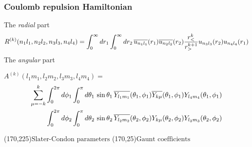 \begin{frame}[t]
  \frametitle{Coulomb repulsion Hamiltonian}
  \footnotesize
  The \emph{radial} part
  \[
  R^{(k)}(n_1l_1,n_2l_2,n_3l_3,n_4l_4) =
  \int_0^\infty dr_1 \int_0^\infty dr_2\, \overline{u_{n_1l_1}}(r_1) \overline{u_{n_2l_2}}(r_2)
  \frac{r_<^k}{r_>^{k+1}} u_{n_3l_3}(r_2) u_{n_4l_4}(r_1)
  \]
  The \emph{angular} part
  
  \vspace{1em}
  $A^{(k)}(l_1m_1,l_2m_2,l_3m_3,l_4m_4) =$
  \begin{align*}
  \sum_{\mu=-k}^k
  & \int_0^{2\pi}d\phi_1 \int_0^{\pi}d\theta_1\,\sin{\theta_1}\,
    \overline{Y_{l_1m_1}}(\theta_1,\phi_1) \overline{Y_{k\mu}}(\theta_1,\phi_1) Y_{l_4m_4}(\theta_1,\phi_1) \nonumber \\
  & \int_0^{2\pi}d\phi_2 \int_0^{\pi}d\theta_2\,\sin{\theta_2}\,
    \overline{Y_{l_2m_2}}(\theta_2,\phi_2) Y_{k\mu}(\theta_2,\phi_2) Y_{l_3m_3}(\theta_2,\phi_2)
  \end{align*} \pause
  
  \Put(170,225){\emph{$\boxed{\text{Slater-Condon parameters}}$}}
  \Put(170,25){\emph{$\boxed{\text{Gaunt coefficients}}$}}
\end{frame}

